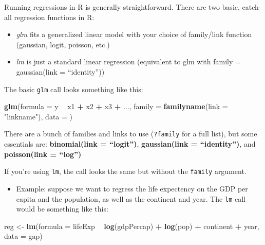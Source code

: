 \documentclass[]{book}
\newenvironment{Shaded}{\begin{snugshade}}{\end{snugshade}}
\newcommand{\DataTypeTok}[1]{\textcolor[rgb]{0.13,0.29,0.53}{#1}}
\newcommand{\KeywordTok}[1]{\textcolor[rgb]{0.13,0.29,0.53}{\textbf{#1}}}
\newcommand{\NormalTok}[1]{#1}
\newcommand{\OperatorTok}[1]{\textcolor[rgb]{0.81,0.36,0.00}{\textbf{#1}}}
\newcommand{\StringTok}[1]{\textcolor[rgb]{0.31,0.60,0.02}{#1}}
\providecommand{\tightlist}{%
  \setlength{\itemsep}{0pt}\setlength{\parskip}{0pt}}
\begin{document}
Running regressions in R is generally straightforward. There are two basic, catch-all regression functions in R:

\begin{itemize}
\item
  \emph{glm} fits a generalized linear model with your choice of family/link function (gaussian, logit, poisson, etc.)
\item
  \emph{lm} is just a standard linear regression (equivalent to glm with family = gaussian(link = ``identity''))
\end{itemize}

The basic \texttt{glm} call looks something like this:

\begin{Shaded}
\begin{Highlighting}[]
\KeywordTok{glm}\NormalTok{(}\DataTypeTok{formula =}\NormalTok{ y }\OperatorTok{~}\StringTok{ }\NormalTok{x1 }\OperatorTok{+}\StringTok{ }\NormalTok{x2 }\OperatorTok{+}\StringTok{ }\NormalTok{x3 }\OperatorTok{+}\StringTok{ }\NormalTok{..., }\DataTypeTok{family =} \KeywordTok{familyname}\NormalTok{(}\DataTypeTok{link =} \StringTok{"linkname"}\NormalTok{), }\DataTypeTok{data =}\NormalTok{ )}
\end{Highlighting}
\end{Shaded}

There are a bunch of families and links to use (\texttt{?family} for a full list), but some essentials are: \textbf{binomial(link = ``logit'')}, \textbf{gaussian(link = ``identity'')}, and \textbf{poisson(link = ``log'')}

If you're using \texttt{lm}, the call looks the same but without the \texttt{family} argument.

\begin{itemize}
\tightlist
\item
  Example: suppose we want to regress the life expectency on the GDP per capita and the population, as well as the continent and year. The \texttt{lm} call would be something like this:
\end{itemize}

\begin{Shaded}
\begin{Highlighting}[]
\NormalTok{reg <-}\StringTok{ }\KeywordTok{lm}\NormalTok{(}\DataTypeTok{formula =}\NormalTok{ lifeExp }\OperatorTok{~}\StringTok{ }\KeywordTok{log}\NormalTok{(gdpPercap) }\OperatorTok{+}\StringTok{ }\KeywordTok{log}\NormalTok{(pop) }\OperatorTok{+}\StringTok{ }\NormalTok{continent }\OperatorTok{+}\StringTok{ }\NormalTok{year, }\DataTypeTok{data =}\NormalTok{ gap)}
\end{Highlighting}
\end{Shaded}
\end{document}
